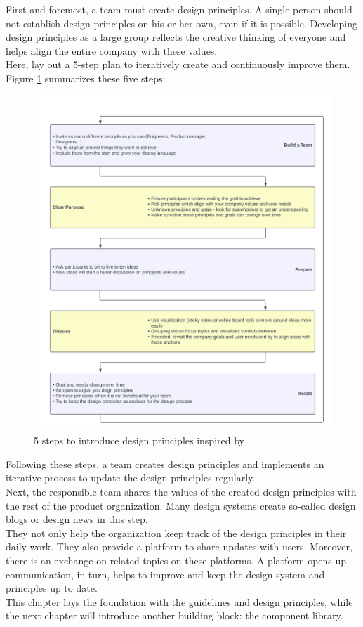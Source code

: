First and foremost, a team must create design principles. A single person should not establish design principles on his or her own, even if it is possible. Developing design principles as a large group reflects the creative thinking of everyone and helps align the entire company with these values. \\
Here, \citet{vesselov_building_2019} lay out a 5-step plan to iteratively create and continuously improve them. Figure \ref{design_principles_steps} summarizes these five steps:
\newpage


\begin{figure}[htbp]
\centerline{\includegraphics[width=\linewidth]{images/design_principles_steps.png}}
\caption{5 steps to introduce design principles inspired by  \citet{vesselov_building_2019}}
\label{design_principles_steps}
\end{figure}
Following these steps, a team creates design principles and implements an iterative process to update the design principles regularly. \\
Next, the responsible team shares the values of the created design principles with the rest of the product organization. Many design systems create so-called design blogs or design news in this step.  \\
They not only help the organization keep track of the design principles in their daily work. They also provide a platform to share updates with users. Moreover, there is an exchange on related topics on these platforms. A platform opens up communication, in turn, helps to improve and keep the design system and principles up to date.  \cite{google_material_2022} \\
This chapter lays the foundation with the guidelines and design principles, while the next chapter will introduce another building block: the component library.
